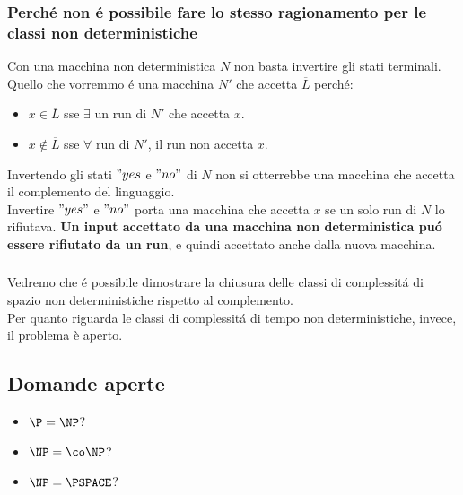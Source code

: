 \subsubsection{Perché non é possibile fare lo stesso ragionamento per le classi non deterministiche}
Con una macchina non deterministica $N$ non basta invertire gli stati terminali. \\
Quello che vorremmo é una macchina $N'$ che accetta $\overline{L}$ perché:
\begin{itemize}
\item $x \in \overline{L}$ sse $\exists$ un run di $N'$ che accetta $x$.
\item $x \notin \overline{L}$ sse $\forall$ run di $N'$, il run non accetta $x$.
\end{itemize}
Invertendo gli stati $"yes$ e $"no"$ di $N$ non si otterrebbe una macchina che accetta il complemento del linguaggio. \\ 
Invertire $"yes"$ e $"no"$ porta una macchina che accetta $x$ se un solo run di $N$ lo rifiutava. 
\textbf{Un input accettato da una macchina non deterministica puó essere rifiutato da un run}, e quindi accettato anche dalla nuova macchina.
\subsubsection*{}
Vedremo che é possibile dimostrare la chiusura delle classi di complessitá di spazio non deterministiche rispetto al complemento. \\
Per quanto riguarda le classi di complessitá di tempo non deterministiche, invece, il problema è aperto. \\

\subsection{Domande aperte}
\begin{itemize}
    \item $\P = \NP$?
    \item $\NP = \co\NP$?
    \item $\NP = \PSPACE$?
\end{itemize}
